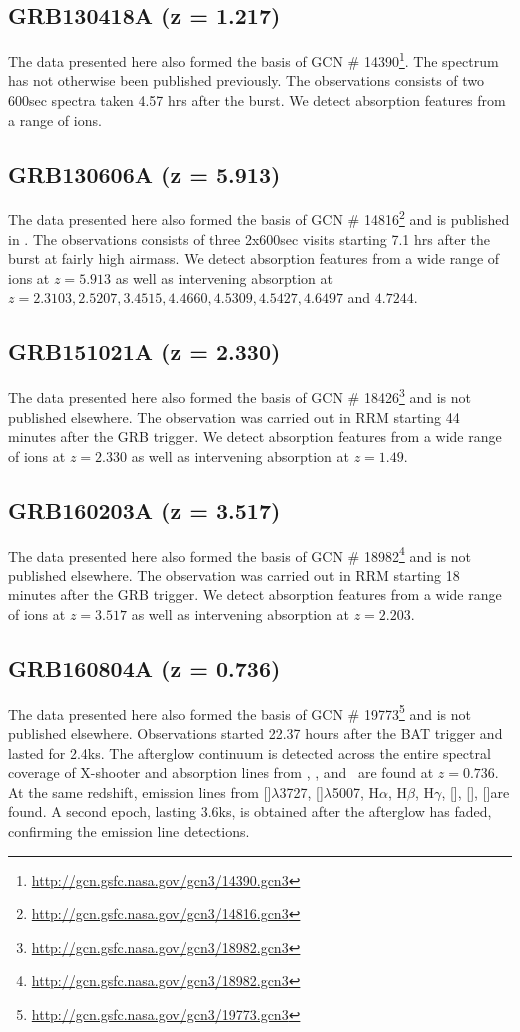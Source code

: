 \documentclass[iop, twocolappendix, numberedappendix, tighten, appendixfloats]{emulateapj}
\newcommand{\hb}{H$\beta$}
\newcommand{\ha}{H$\alpha$}
\newcommand{\hg}{H$\gamma$}
\newcommand{\sii}{[\ion{S}{2}]}
\newcommand{\siii}{[\ion{S}{3}]}
\newcommand{\oii}{[\ion{O}{2}]$\lambda$3727}
\newcommand{\oiii}{[\ion{O}{3}]$\lambda$5007}
\newcommand{\nii}{[\ion{N}{2}]}
\newcommand{\feii}{\ion{Fe}{2}}
\newcommand{\mgi}{\ion{Mg}{1}}
\newcommand{\mgii}{\ion{Mg}{2}}
\newcommand{\alii}{\ion{Al}{2}}
\begin{document}
	\subsection{GRB130418A (z = 1.217)}
	The data presented here also formed the basis of GCN \#
	14390\footnote{\url{http://gcn.gsfc.nasa.gov/gcn3/14390.gcn3}}. The spectrum
	has not otherwise been published previously. The observations consists of two
	600sec spectra taken 4.57 hrs after the burst. We detect absorption features from
	a range of ions. 
	
	\subsection{GRB130606A (z = 5.913)}
	The data presented here also formed the basis of GCN \#
	14816\footnote{\url{http://gcn.gsfc.nasa.gov/gcn3/14816.gcn3}} and is published
	in \citet{Hartoog2015}. The observations consists of three 2x600sec visits
	starting 7.1 hrs after the burst at fairly high airmass. We detect absorption
	features from a wide range of ions at $z=5.913$ as well as intervening
	absorption at $z=2.3103, 2.5207, 3.4515, 4.4660, 4.5309, 4.5427, 4.6497 $ and $
	4.7244$.

	\subsection{GRB151021A (z = 2.330)}
	The data presented here also formed the basis of GCN \#
	18426\footnote{\url{http://gcn.gsfc.nasa.gov/gcn3/18982.gcn3}} and is not
	published elsewhere. The observation was carried out in RRM starting 44 minutes
	after the GRB trigger. We detect absorption features from a wide range of ions
	at $z=2.330$ as well as intervening absorption at $z=1.49$.

	\subsection{GRB160203A (z = 3.517)}
	The data presented here also formed the basis of GCN \#
	18982\footnote{\url{http://gcn.gsfc.nasa.gov/gcn3/18982.gcn3}} and is not
	published elsewhere. The observation was carried out in RRM starting 18 minutes
	after the GRB trigger. We detect absorption features from a wide range of ions
	at $z=3.517$ as well as intervening absorption at $z=2.203$.

	\subsection{GRB160804A (z = 0.736)}
	The data presented here also formed the basis of GCN \#
	19773\footnote{\url{http://gcn.gsfc.nasa.gov/gcn3/19773.gcn3}} and is not
	published elsewhere. Observations started 22.37 hours after the BAT trigger and
	lasted for 2.4ks. The afterglow continuum is detected across the entire
	spectral coverage of X-shooter and absorption lines from \mgi, \mgii, \feii and
	\alii~are found at $z = 0.736$. At the same redshift, emission lines from \oii,
	\oiii, \ha, \hb, \hg, \nii, \sii, \siii are found. A second epoch, lasting
	3.6ks, is obtained after the afterglow has faded, confirming the emission line
	detections.
	
\end{document}
